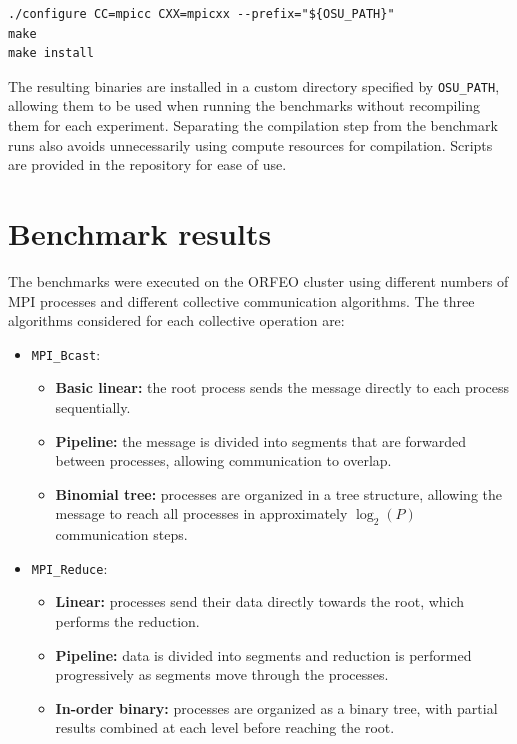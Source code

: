 \documentclass[a4paper]{article}
\begin{document}
\begin{verbatim}
./configure CC=mpicc CXX=mpicxx --prefix="${OSU_PATH}"
make
make install
\end{verbatim}

The resulting binaries are installed in a custom directory specified by \texttt{OSU\_PATH}, allowing them to be used when running the benchmarks without recompiling them for each experiment. Separating the compilation step from the benchmark runs also avoids unnecessarily using compute resources for compilation. Scripts are provided in the repository for ease of use.

\section{Benchmark results}

The benchmarks were executed on the ORFEO cluster using different numbers of MPI processes and different collective communication algorithms. The three algorithms considered for each collective operation are:

\begin{itemize}
\item \texttt{MPI\_Bcast}:
\begin{itemize}
\item \textbf{Basic linear:} the root process sends the message directly to each process sequentially.
\item \textbf{Pipeline:} the message is divided into segments that are forwarded between processes, allowing communication to overlap.
\item \textbf{Binomial tree:} processes are organized in a tree structure, allowing the message to reach all processes in approximately $\log_2(P)$ communication steps.
\end{itemize}

\item \texttt{MPI\_Reduce}:
\begin{itemize}
    \item \textbf{Linear:} processes send their data directly towards the root, which performs the reduction.
    \item \textbf{Pipeline:} data is divided into segments and reduction is performed progressively as segments move through the processes.
    \item \textbf{In-order binary:} processes are organized as a binary tree, with partial results combined at each level before reaching the root.
\end{itemize}


\end{itemize}
\end{document}
